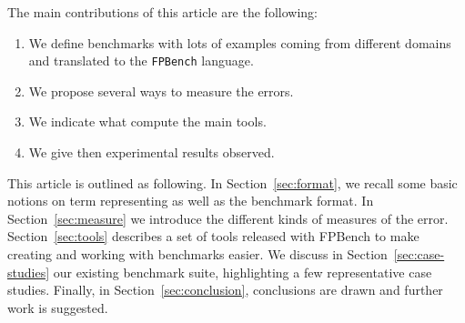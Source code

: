 \documentclass[main.tex]{subfiles}
\begin{document}
The main contributions of this article are the following:
\begin{enumerate}[label=(\roman*)]
\item We define benchmarks with lots of examples coming from different
  domains and translated to the \texttt{FPBench} language.
\item We propose several ways to measure the errors. 
\item We indicate what compute the main tools. 
\item We give then experimental results observed.
\end{enumerate}


This article is outlined as following. In Section~\ref{sec:format}, we
recall some basic notions on term representing as well as the
benchmark format. In Section~\ref{sec:measure} we introduce the
different kinds of measures of the error. Section~\ref{sec:tools}
describes a set of tools released with FPBench to make creating and
working with benchmarks easier. We discuss in
Section~\ref{sec:case-studies} our existing benchmark suite,
highlighting a few representative case studies. Finally, in
Section~\ref{sec:conclusion}, conclusions are drawn and further work
is suggested.





%
%
%
%
%
\end{document}
